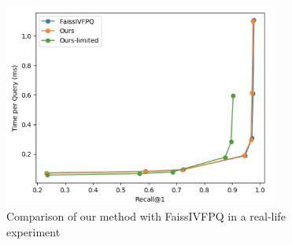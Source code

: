 \begin{figure}
    \centering
    \includegraphics[width=0.8\textwidth]{thesis/images/real_data_experiment.png}
    \caption{Comparison of our method with FaissIVFPQ in a real-life experiment}
    \label{fig:realdataexp}
\end{figure}

